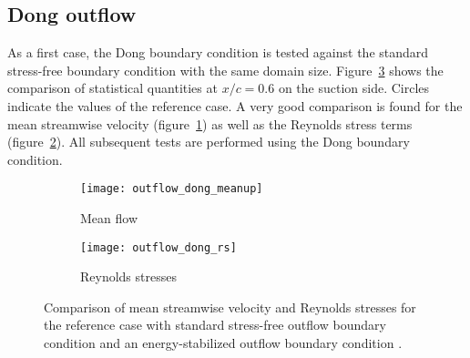 \subsection{Dong outflow}
As a first case, the Dong boundary condition is tested against the standard stress-free boundary condition with the same domain size. Figure~\ref{fig:outflow_dong} shows the comparison of statistical quantities at $x/c=0.6$ on the suction side. Circles indicate the values of the reference case. A very good comparison is found for the mean streamwise velocity (figure~\ref{fig:outflow_dong_up}) as well as the Reynolds stress terms (figure~\ref{fig:outflow_dong_rs}). All subsequent tests are performed using the Dong boundary condition.
\begin{figure}[h]
	\centering
	\begin{subfigure}[h]{0.45\textwidth}
		\centering
		\texttt{[image: outflow\_dong\_meanup]}
		\caption{Mean flow}
		\label{fig:outflow_dong_up}
	\end{subfigure}
	\begin{subfigure}[h]{0.45\textwidth}
		\centering
		\texttt{[image: outflow\_dong\_rs]}
		\caption{Reynolds stresses}
		\label{fig:outflow_dong_rs}
	\end{subfigure}
	\caption{Comparison of mean streamwise velocity and Reynolds stresses for the reference case with standard stress-free outflow boundary condition and an energy-stabilized outflow boundary condition \citep{dong2014}.}
	\label{fig:outflow_dong}
\end{figure}

